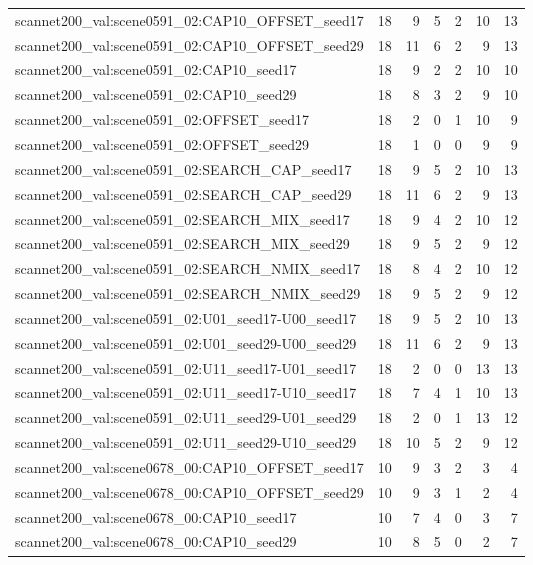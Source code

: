 \begin{table}[t]
\begin{tabular}{lrrrrrr}
scannet200\_val:scene0591\_02:CAP10\_OFFSET\_seed17 & 18 & 9 & 5 & 2 & 10 & 13 \\
scannet200\_val:scene0591\_02:CAP10\_OFFSET\_seed29 & 18 & 11 & 6 & 2 & 9 & 13 \\
scannet200\_val:scene0591\_02:CAP10\_seed17 & 18 & 9 & 2 & 2 & 10 & 10 \\
scannet200\_val:scene0591\_02:CAP10\_seed29 & 18 & 8 & 3 & 2 & 9 & 10 \\
scannet200\_val:scene0591\_02:OFFSET\_seed17 & 18 & 2 & 0 & 1 & 10 & 9 \\
scannet200\_val:scene0591\_02:OFFSET\_seed29 & 18 & 1 & 0 & 0 & 9 & 9 \\
scannet200\_val:scene0591\_02:SEARCH\_CAP\_seed17 & 18 & 9 & 5 & 2 & 10 & 13 \\
scannet200\_val:scene0591\_02:SEARCH\_CAP\_seed29 & 18 & 11 & 6 & 2 & 9 & 13 \\
scannet200\_val:scene0591\_02:SEARCH\_MIX\_seed17 & 18 & 9 & 4 & 2 & 10 & 12 \\
scannet200\_val:scene0591\_02:SEARCH\_MIX\_seed29 & 18 & 9 & 5 & 2 & 9 & 12 \\
scannet200\_val:scene0591\_02:SEARCH\_NMIX\_seed17 & 18 & 8 & 4 & 2 & 10 & 12 \\
scannet200\_val:scene0591\_02:SEARCH\_NMIX\_seed29 & 18 & 9 & 5 & 2 & 9 & 12 \\
scannet200\_val:scene0591\_02:U01\_seed17-U00\_seed17 & 18 & 9 & 5 & 2 & 10 & 13 \\
scannet200\_val:scene0591\_02:U01\_seed29-U00\_seed29 & 18 & 11 & 6 & 2 & 9 & 13 \\
scannet200\_val:scene0591\_02:U11\_seed17-U01\_seed17 & 18 & 2 & 0 & 0 & 13 & 13 \\
scannet200\_val:scene0591\_02:U11\_seed17-U10\_seed17 & 18 & 7 & 4 & 1 & 10 & 13 \\
scannet200\_val:scene0591\_02:U11\_seed29-U01\_seed29 & 18 & 2 & 0 & 1 & 13 & 12 \\
scannet200\_val:scene0591\_02:U11\_seed29-U10\_seed29 & 18 & 10 & 5 & 2 & 9 & 12 \\
scannet200\_val:scene0678\_00:CAP10\_OFFSET\_seed17 & 10 & 9 & 3 & 2 & 3 & 4 \\
scannet200\_val:scene0678\_00:CAP10\_OFFSET\_seed29 & 10 & 9 & 3 & 1 & 2 & 4 \\
scannet200\_val:scene0678\_00:CAP10\_seed17 & 10 & 7 & 4 & 0 & 3 & 7 \\
scannet200\_val:scene0678\_00:CAP10\_seed29 & 10 & 8 & 5 & 0 & 2 & 7 \\

\end{tabular}
\end{table}
